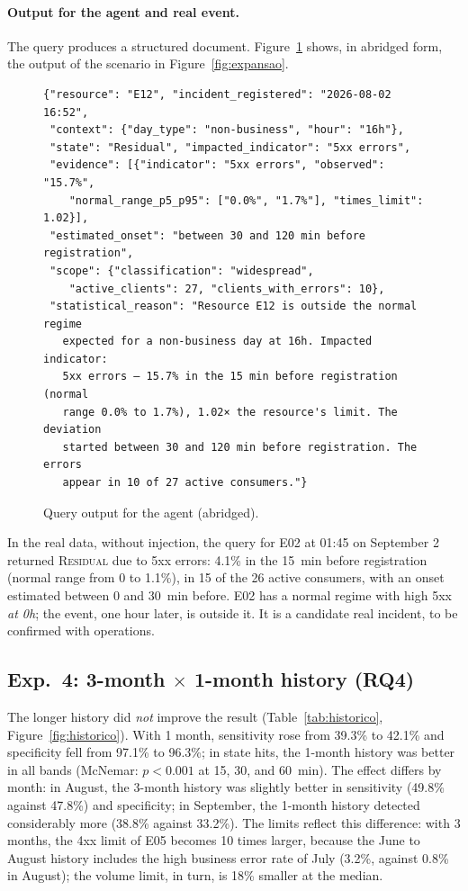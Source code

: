 \documentclass[sigconf,nonacm]{acmart}
\newcommand{\Residual}{\textsc{Residual}\xspace}
\begin{document}
\paragraph{Output for the agent and real event.} The query produces a structured document. Figure~\ref{fig:json} shows, in abridged form, the output of the scenario in Figure~\ref{fig:expansao}.

\begin{figure}[t]
\begin{Verbatim}[fontsize=\scriptsize,frame=single]
{"resource": "E12", "incident_registered": "2026-08-02 16:52",
 "context": {"day_type": "non-business", "hour": "16h"},
 "state": "Residual", "impacted_indicator": "5xx errors",
 "evidence": [{"indicator": "5xx errors", "observed": "15.7%",
    "normal_range_p5_p95": ["0.0%", "1.7%"], "times_limit": 1.02}],
 "estimated_onset": "between 30 and 120 min before registration",
 "scope": {"classification": "widespread",
    "active_clients": 27, "clients_with_errors": 10},
 "statistical_reason": "Resource E12 is outside the normal regime
   expected for a non-business day at 16h. Impacted indicator:
   5xx errors — 15.7% in the 15 min before registration (normal
   range 0.0% to 1.7%), 1.02× the resource's limit. The deviation
   started between 30 and 120 min before registration. The errors
   appear in 10 of 27 active consumers."}
\end{Verbatim}
\caption{Query output for the agent (abridged).}
\label{fig:json}
\end{figure}

In the real data, without injection, the query for E02 at 01:45 on September 2 returned \Residual due to 5xx errors: 4.1\% in the 15~min before registration (normal range from 0 to 1.1\%), in 15 of the 26 active consumers, with an onset estimated between 0 and 30~min before. E02 has a normal regime with high 5xx \emph{at 0h}; the event, one hour later, is outside it. It is a candidate real incident, to be confirmed with operations.

\subsection{Exp.~4: 3-month $\times$ 1-month history (RQ4)}
The longer history did \emph{not} improve the result (Table~\ref{tab:historico}, Figure~\ref{fig:historico}). With 1 month, sensitivity rose from 39.3\% to 42.1\% and specificity fell from 97.1\% to 96.3\%; in state hits, the 1-month history was better in all bands (McNemar: $p<0.001$ at 15, 30, and 60~min). The effect differs by month: in August, the 3-month history was slightly better in sensitivity (49.8\% against 47.8\%) and specificity; in September, the 1-month history detected considerably more (38.8\% against 33.2\%). The limits reflect this difference: with 3 months, the 4xx limit of E05 becomes 10 times larger, because the June to August history includes the high business error rate of July (3.2\%, against 0.8\% in August); the volume limit, in turn, is 18\% smaller at the median.
\end{document}
